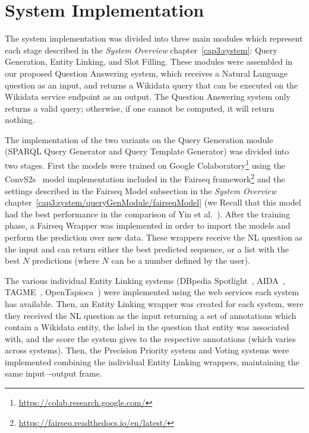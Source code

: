 \section{System Implementation}
\label{cap4:experimentalDesign/systemImplementation}
The system implementation was divided into three main modules which represent each stage 
described in the \textit{System Overview} chapter~\ref{cap3:system}: Query Generation, Entity Linking, and Slot 
Filling. These modules were assembled in our proposed Question Answering system, which receives 
a Natural Language question as an input, and returns a Wikidata \SPARQL{} query that can be executed 
on the Wikidata service endpoint as an output. The Question Answering system only returns a valid 
\SPARQL{} query; otherwise, if one cannot be computed, it will return nothing.

The implementation of the two variants on the Query Generation module (SPARQL Query Generator 
and Query Template Generator) was divided into two stages. First the models were trained on 
Google Colaboratory\footnote{\url{https://colab.research.google.com/}} using the 
ConvS2s~\cite{nmt:convS2S-GehringAGYD17} model implementation included in the Fairseq 
framework\footnote{\url{https://fairseq.readthedocs.io/en/latest/}} and the settings described in the 
Fairseq Model subsection in the \textit{System Overview} chapter~\ref{cap3:system/queryGenModule/fairseqModel} 
(we Recall that this model had 
the best performance in the comparison of Yin et al.~\cite{nmt:nl-to-sparql-Yin19}). After the 
training phase, a Fairseq Wrapper was implemented in order to import the models and perform the 
prediction over new data. These wrappers receive the NL question as the input and can return 
either the best predicted sequence, or a list with the best $N$ predictions (where $N$ can be a 
number defined by the user).

The various individual Entity Linking systems (DBpedia Spotlight~\cite{EL:dbpedia-spotlight-MendesJGB11}, 
AIDA~\cite{EL:aida-tool-YosefHBSW11, EL:aida-HoffartYBFPSTTW11}, TAGME~\cite{EL:tagme-FerraginaS10}, 
OpenTapioca~\cite{EL:opentapioca-Delpeuch19}) were implemented using the web services each system 
has available. Then, an Entity Linking wrapper was created for each system, were they received the 
NL question as the input returning a set of annotations which contain a Wikidata entity, the 
label in the question that entity was associated with, and the score the system gives to the 
respective annotations (which varies across systems). Then, the Precision Priority system and 
Voting systems were implemented combining the individual Entity Linking wrappers, maintaining 
the same input–-output frame.

